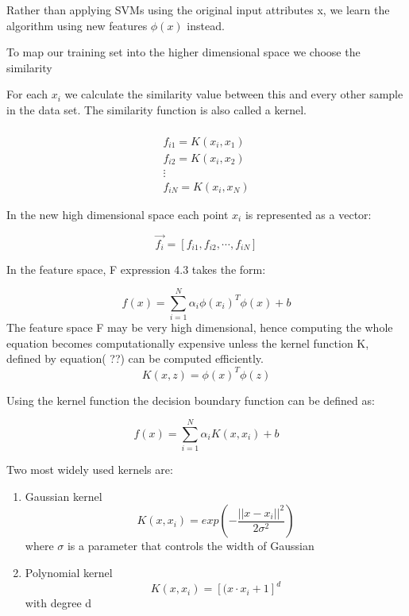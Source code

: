 Rather than applying SVMs using the original input attributes x, we learn the algorithm using new features $\phi(x)$ instead.

To map our training set into the higher dimensional space we choose the similarity 

For each $x_{i}$ we calculate the similarity value between this  and every other sample in the data set. The similarity function is also called a kernel.

\begin{equation}
\begin{multlined}
\\
f_{i1} = K(x_{i}, x_{1})\\
f_{i2} = K(x_{i}, x_{2})\\
\vdots\\
f_{iN} = K(x_{i}, x_{N})
\end{multlined}
\end{equation}

In the new high dimensional space each point $x_{i}$ is represented as a vector:

\begin{equation}
\vec{f_{i}} = [f_{i1}, f_{i2}, \cdots, f_{iN}]
\end{equation}

In the feature space, F expression 4.3 takes the form:

\begin{equation}
f(x) = \sum_{i=1}^{N} \alpha_{i}\phi(x_{i})^T \phi(x) + b
\end{equation}
The feature space F may be very high dimensional, hence computing the whole equation becomes computationally expensive unless the kernel function K, defined by equation( ??) can be computed efficiently.
\begin{equation}
K(x,z) = \phi(x)^T\phi(z)
\end{equation}

Using the kernel function the decision boundary function can be defined as: 

\begin{equation}
f(x) = \sum_{i=1}^{N} \alpha_{i}K(x, x_{i})+ b
\end{equation}

Two most widely used kernels are:
\begin{enumerate}
\itemsep0em 
\item Gaussian kernel
\begin{equation}
K(x,x_{i}) = exp(-\frac{||x-x_{i}||^2}{2\sigma^2})
\end{equation}
where $\sigma$ is a parameter that controls the width of Gaussian
\item Polynomial kernel 
\begin{equation}
K(x,x_{i}) = [(x \cdot x_{i} + 1]^d
\end{equation}
with degree d
\end{enumerate} 


